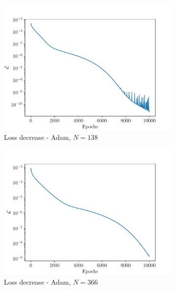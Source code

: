 \begin{figure}
	\begin{subfigure}[t]{0.5\linewidth}
	\centering
	\includegraphics[width=\linewidth]{Figures/Loss_residual_ADAM_square.pdf}
	\caption{Loss decrease - Adam, $N = 138$}
	\end{subfigure}
	\begin{subfigure}[t]{0.5\linewidth}
		\centering
		\includegraphics[width=\linewidth]{Figures/Loss_residual_ADAM_square_finerMesh.pdf}
	\caption{Loss decrease - Adam, $N = 366$}
	\end{subfigure}  
		\begin{subfigure}[t]{0.5\linewidth}
		\centering

\end{subfigure}
\end{figure}
